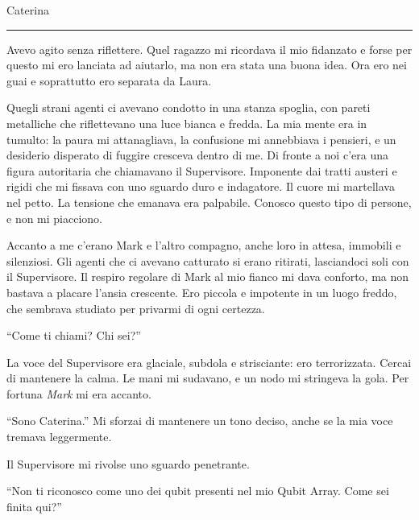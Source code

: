 \vspace{1em}
\begin{center}Caterina\end{center}
\hrule
\vspace{1em}

Avevo agito senza riflettere. Quel ragazzo mi ricordava il mio fidanzato e forse per questo mi ero lanciata ad aiutarlo, ma non era stata una buona idea. Ora ero nei guai e soprattutto ero separata da Laura.

Quegli strani agenti ci avevano condotto in una stanza spoglia, con pareti metalliche che riflettevano una luce bianca e fredda. La mia mente era in tumulto: la paura mi attanagliava, la confusione mi annebbiava i pensieri, e un desiderio disperato di fuggire cresceva dentro di me. Di fronte a noi c'era una figura autoritaria che chiamavano il Supervisore. Imponente dai tratti austeri e rigidi che mi fissava con uno sguardo duro e indagatore. Il cuore mi martellava nel petto. La tensione che emanava era palpabile. Conosco questo tipo di persone, e non mi piacciono.

Accanto a me c'erano Mark e l'altro compagno, anche loro in attesa, immobili e silenziosi. Gli agenti che ci avevano catturato si erano ritirati, lasciandoci soli con il Supervisore. Il respiro regolare di Mark al mio fianco mi dava conforto, ma non bastava a placare l'ansia crescente. Ero  piccola e impotente in un luogo freddo, che sembrava studiato per privarmi di ogni certezza.

\begin{dialogue}
 \enquote{Come ti chiami? Chi sei?}
\end{dialogue}

La voce del Supervisore era glaciale, subdola e strisciante: ero terrorizzata. Cercai di mantenere la calma. Le mani mi sudavano, e un nodo mi stringeva la gola. Per fortuna \textit{Mark} mi era accanto.

\begin{dialogue}
 \enquote{Sono Caterina.} Mi  sforzai di mantenere un tono deciso, anche se la mia voce tremava leggermente. 
\end{dialogue}

Il Supervisore mi rivolse uno sguardo penetrante.

\begin{dialogue}
 \enquote{Non ti riconosco come uno dei qubit presenti nel mio Qubit Array. Come sei finita qui?}
\end{dialogue}

